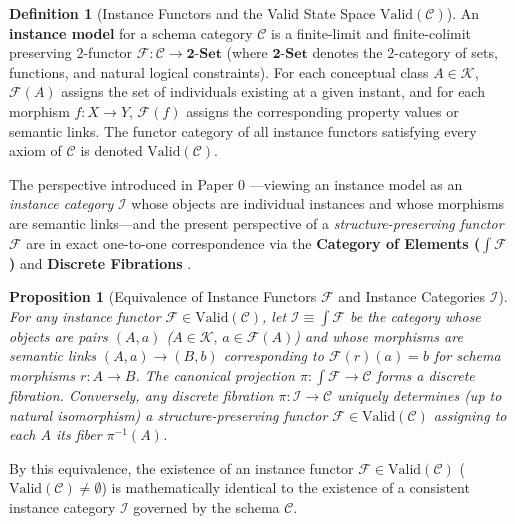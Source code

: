 \documentclass[11pt,a4paper]{article}
\theoremstyle{definition}
\newtheorem{definition}{Definition}[section]
\theoremstyle{plain}
\newtheorem{proposition}{Proposition}[section]
\theoremstyle{remark}
\newcommand{\Valid}{\mathrm{Valid}}
\newcommand{\TwoSet}{\mathbf{2\text{-}Set}}
\begin{document}
\begin{definition}[Instance Functors and the Valid State Space $\Valid(\mathcal{C})$]\label{def:instance-functor}
An \textbf{instance model} for a schema category $\mathcal{C}$ is a finite-limit and finite-colimit preserving 2-functor $\mathcal{F} : \mathcal{C} \to \TwoSet$ (where $\TwoSet$ denotes the 2-category of sets, functions, and natural logical constraints). For each conceptual class $A \in \mathcal{K}$, $\mathcal{F}(A)$ assigns the set of individuals existing at a given instant, and for each morphism $f : X \to Y$, $\mathcal{F}(f)$ assigns the corresponding property values or semantic links. The functor category of all instance functors satisfying every axiom of $\mathcal{C}$ is denoted $\Valid(\mathcal{C})$.
\end{definition}

The perspective introduced in Paper 0 \cite{ota2026paper0}---viewing an instance model as an \emph{instance category} $\mathcal{I}$ whose objects are individual instances and whose morphisms are semantic links---and the present perspective of a \emph{structure-preserving functor} $\mathcal{F}$ are in exact one-to-one correspondence via the \textbf{Category of Elements ($\int \mathcal{F}$)} and \textbf{Discrete Fibrations} \cite{maclane1998,spivak2012}.

\begin{proposition}[Equivalence of Instance Functors $\mathcal{F}$ and Instance Categories $\mathcal{I}$]\label{prop:cat-elements}
For any instance functor $\mathcal{F} \in \Valid(\mathcal{C})$, let $\mathcal{I} \equiv \int \mathcal{F}$ be the category whose objects are pairs $(A, a)$ ($A \in \mathcal{K},\, a \in \mathcal{F}(A)$) and whose morphisms are semantic links $(A, a) \to (B, b)$ corresponding to $\mathcal{F}(r)(a) = b$ for schema morphisms $r : A \to B$. The canonical projection $\pi : \int \mathcal{F} \to \mathcal{C}$ forms a discrete fibration. Conversely, any discrete fibration $\pi : \mathcal{I} \to \mathcal{C}$ uniquely determines (up to natural isomorphism) a structure-preserving functor $\mathcal{F} \in \Valid(\mathcal{C})$ assigning to each $A$ its fiber $\pi^{-1}(A)$.
\end{proposition}

By this equivalence, the existence of an instance functor $\mathcal{F} \in \Valid(\mathcal{C})$ ($\Valid(\mathcal{C}) \neq \emptyset$) is mathematically identical to the existence of a consistent instance category $\mathcal{I}$ governed by the schema $\mathcal{C}$.
\end{document}
